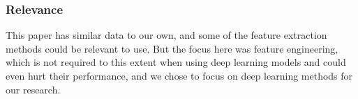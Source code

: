 \documentclass{article}
\begin{document}
\subsubsection*{Relevance}
This paper has similar data to our own, and some of the feature extraction methods 
could be relevant to use. But the focus here was feature engineering, 
which is not required to this extent when using deep learning models and could even hurt their performance, 
and we chose to focus on deep learning methods for our research.

\newpage


\end{document}

